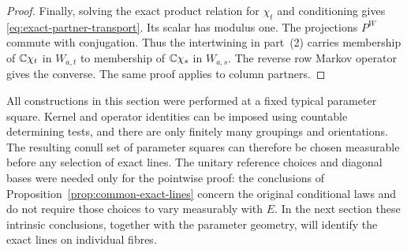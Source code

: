 \begin{proof}
Finally, solving the exact product relation for $\chi_t$ and conditioning
gives \eqref{eq:exact-partner-transport}.  Its scalar has modulus one.
The projections $P^W$ commute with conjugation.  Thus the intertwining
in part~(2) carries membership of $\mathbb C\chi_t$ in $W_{a,t}$ to membership
of $\mathbb C\chi_s$ in $W_{a,s}$.  The reverse row Markov operator gives the
converse.  The same proof applies to column partners.
\end{proof}

All constructions in this section were performed at a fixed typical
parameter square.  Kernel and operator identities can be imposed using
countable determining tests, and there are only finitely many groupings
and orientations.  The resulting conull set of parameter squares can
therefore be chosen measurable before any selection of exact lines.
The unitary reference choices and diagonal bases were needed only for
the pointwise proof: the conclusions of
Proposition~\ref{prop:common-exact-lines} concern the original conditional
laws and do not require those choices to vary measurably with $E$.
In the next section these intrinsic conclusions, together with the
parameter geometry, will identify the exact lines on individual fibres.
